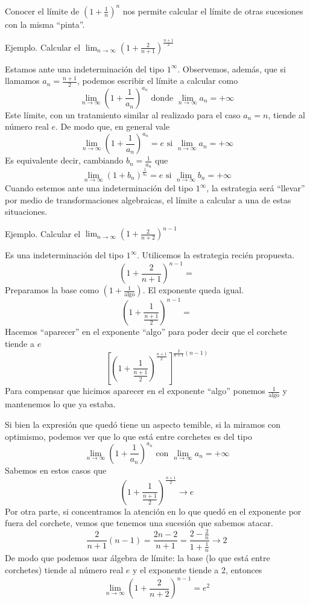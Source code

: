 \documentclass[../teoria.root.tex]{subfiles}
\begin{document}
Conocer el límite de \(\left(1+\frac{1}{n}\right)^n\) nos permite calcular el límite de otras sucesiones con la misma “pinta”.

Ejemplo.
Calcular el \(\lim_{n\to\infty}\left(1+\frac{2}{n+1}\right)^{\frac{n+1}{2}}\)

Estamos ante una indeterminación del tipo \(1^\infty\).
Observemos, además, que si llamamos \(a_n=\frac{n+1}{2}\), podemos escribir el límite a calcular como
\[\lim_{n\to\infty}\left(1+\frac{1}{a_n}\right)^{a_n}\text{ donde }\lim_{n\to\infty}a_n=+\infty\]
Este límite, con un tratamiento similar al realizado para el caso \(a_n=n\), tiende al número real \(e\).
De modo que, en general vale
\[\lim_{n\to\infty}\left(1+\frac{1}{a_n}\right)^{a_n}=e\text{ si }\lim_{n\to\infty}a_n=+\infty\]
Es equivalente decir, cambiando \(b_n=\frac{1}{a_n}\) que
\[\lim_{n\to\infty}\left(1+b_n\right)^{\frac{1}{b_n}}=e\text{ si }\lim_{n\to\infty}b_n=+\infty\]
Cuando estemos ante una indeterminación del tipo \(1^\infty\), la estrategia será “llevar” por medio de transformaciones algebraicas, el límite a calcular a una de estas situaciones.

Ejemplo.
Calcular el \(\lim_{n\to\infty}\left(1+\frac{2}{n+2}\right)^{n-1}\)

Es una indeterminación del tipo \(1^\infty\).
Utilicemos la estrategia recién propuesta.
\[\left(1+\frac{2}{n+1}\right)^{n-1}=\]
Preparamos la base como \(\left(1+\frac{1}{\text{algo}}\right)\).
El exponente queda igual.
\[\left(1+\frac{1}{\frac{n+1}{2}}\right)^{n-1}=\]
Hacemos ``aparecer'' en el exponente ``algo'' para poder decir que el corchete tiende a \(e\)
\[\left[\left(1+\frac{1}{\frac{n+1}{2}}\right)^{\frac{n+1}{2}}\right]^{\frac{2}{n+1}(n-1)}\]
Para compensar que hicimos aparecer en el exponente ``algo'' ponemos \(\frac{1}{\text{algo}}\) y mantenemos lo que ya estaba.

Si bien la expresión que quedó tiene un aspecto temible, si la miramos con optimismo, podemos ver que lo que está entre corchetes es del tipo
\[\lim_{n\to\infty}\left(1+\frac{1}{a_n}\right)^{a_n}\text{ con }\lim_{n\to\infty}a_n=+\infty\]
Sabemos en estos casos que
\[\left(1+\frac{1}{\frac{n+1}{2}}\right)^{\frac{n+1}{2}}\rightarrow e\]
Por otra parte, si concentramos la atención en lo que quedó en el exponente por fuera del corchete, vemos que tenemos una sucesión que sabemos atacar.
\[\frac{2}{n+1}(n-1)=\frac{2n-2}{n+1}=\frac{2-\frac{2}{n}}{1+\frac{1}{n}}\rightarrow2\]
De modo que podemos usar álgebra de límite:
la base (lo que está entre corchetes) tiende al número real \(e\) y el exponente tiende a 2, entonces
\[\lim_{n\to\infty}\left(1+\frac{2}{n+2}\right)^{n-1}=e^2\]
\end{document}
